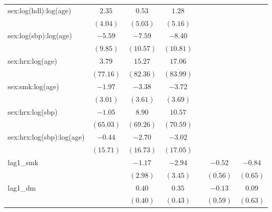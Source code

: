 \begin{tabular}{l c c c c c c}
sex:log(hdl):log(age)             & $2.35$       & $0.53$     & $1.28$     &                &                &                \\
                                  & $(4.04)$     & $(5.03)$   & $(5.16)$   &                &                &                \\
sex:log(sbp):log(age)             & $-5.59$      & $-7.59$    & $-8.40$    &                &                &                \\
                                  & $(9.85)$     & $(10.57)$  & $(10.81)$  &                &                &                \\
sex:hrx:log(age)                  & $3.79$       & $15.27$    & $17.06$    &                &                &                \\
                                  & $(77.16)$    & $(82.36)$  & $(83.99)$  &                &                &                \\
sex:smk:log(age)                  & $-1.97$      & $-3.38$    & $-3.72$    &                &                &                \\
                                  & $(3.01)$     & $(3.61)$   & $(3.69)$   &                &                &                \\
sex:hrx:log(sbp)                  & $-1.05$      & $8.90$     & $10.57$    &                &                &                \\
                                  & $(65.03)$    & $(69.26)$  & $(70.59)$  &                &                &                \\
sex:hrx:log(sbp):log(age)         & $-0.44$      & $-2.70$    & $-3.02$    &                &                &                \\
                                  & $(15.71)$    & $(16.73)$  & $(17.05)$  &                &                &                \\
lag1\_smk                         &              & $-1.17$    & $-2.94$    &                & $-0.52$        & $-0.84$        \\
                                  &              & $(2.98)$   & $(3.45)$   &                & $(0.56)$       & $(0.65)$       \\
lag1\_dm                          &              & $0.40$     & $0.35$     &                & $-0.13$        & $0.09$         \\
                                  &              & $(0.40)$   & $(0.43)$   &                & $(0.59)$       & $(0.63)$       \\

\end{tabular}
